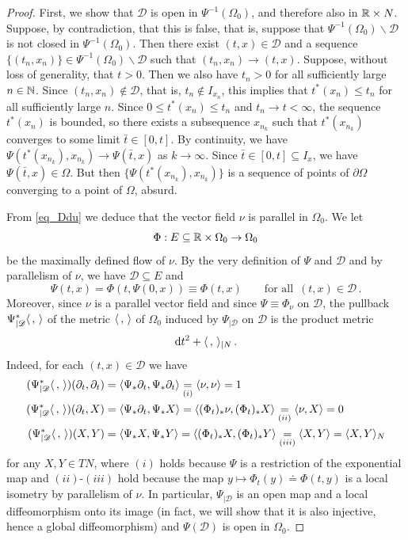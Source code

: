 \documentclass[10 pt,a4paper]{article}
\theoremstyle{definition}
\begin{document}
\begin{proof}
	First, we show that $\mathscr D$ is open in $\Psi^{-1}(\Omega_0)$, and therefore also in $\mathbb R\times N$. Suppose, by contradiction, that this is false, that is, suppose that $\Psi^{-1}(\Omega_0)\backslash\mathscr D$ is not closed in $\Psi^{-1}(\Omega_0)$. Then there exist $(t,x) \in \mathscr D$ and a sequence $\{(t_n,x_n)\} \in \Psi^{-1}(\Omega_0)\backslash\mathscr D$ such that $(t_n,x_n) \to (t,x)$. Suppose, without loss of generality, that $t>0$. Then we also have $t_n > 0$ for all sufficiently large $n\in\mathbb N$. Since $(t_n,x_n)\not\in\mathscr D$, that is, $t_n \not\in I_{x_n}$, this implies that $t^\ast(x_n) \leq t_n$ for all sufficiently large $n$. Since $0 \leq t^\ast(x_n) \leq t_n$ and $t_n \to t < \infty$, the sequence $t^\ast(x_n)$ is bounded, so there exists a subsequence $x_{n_k}$ such that $t^\ast(x_{n_k})$ converges to some limit $\bar t \in [0,t]$. By continuity, we have $\Psi(t^\ast(x_{n_k}),x_{n_k}) \to \Psi(\bar t,x)$ as $k\to\infty$. Since $\bar t \in [0,t] \subseteq I_x$, we have $\Psi(\bar t,x) \in \Omega$. But then $\{\Psi(t^\ast(x_{n_k}),x_{n_k})\}$ is a sequence of points of $\partial\Omega$ converging to a point of $\Omega$, absurd.
	
	From \eqref{eq_Ddu} we deduce that the vector field $\nu$ is parallel in $\Omega_0$. We let
	\[
		\Phi : E \subseteq \mathbb R \times \Omega_0 \to \Omega_0
	\]
	be the maximally defined flow of $\nu$. By the very definition of $\Psi$ and $\mathscr D$ and by parallelism of $\nu$, we have $\mathscr D \subseteq E$ and
	\[
		\Psi(t,x) = \Phi(t,\Psi(0,x)) \equiv \Phi(t,x) \qquad \text{for all } \, (t,x) \in \mathscr D \, .
	\]
	Moreover, since $\nu$ is a parallel vector field and since $\Psi \equiv \Phi_\nu$ on $\mathscr D$, the pullback $\Psi_{|\mathscr D}^\ast \langle \, , \, \rangle$ of the metric $\langle \, , \, \rangle$ of $\Omega_0$ induced by $\Psi_{|\mathscr D}$ on $\mathscr D$ is the product metric
	\[
		\mathrm{d} t^2 + \langle \, , \, \rangle_{|N} \, .
	\]
	Indeed, for each $(t,x)\in\mathscr D$ we have
	\begin{align*}
		(\Psi_{|\mathscr D}^\ast \langle \, , \, \rangle)(\partial_t,\partial_t) & = \langle\Psi_\ast\partial_t,\Psi_\ast\partial_t\rangle \underset{(i)}{=} \langle\nu,\nu\rangle = 1 \\
		(\Psi_{|\mathscr D}^\ast \langle \, , \, \rangle)(\partial_t,X) & = \langle\Psi_\ast\partial_t,\Psi_\ast X\rangle = \langle(\Phi_t)_\ast\nu,(\Phi_t)_\ast X\rangle \underset{(ii)}{=} \langle\nu,X\rangle = 0 \\
		(\Psi_{|\mathscr D}^\ast \langle \, , \, \rangle)(X,Y) & = \langle\Psi_\ast X,\Psi_\ast Y\rangle = \langle(\Phi_t)_\ast X,(\Phi_t)_\ast Y\rangle \underset{(iii)}{=} \langle X,Y\rangle = \langle X,Y\rangle_N
	\end{align*}
	for any $X,Y\in TN$, where $(i)$ holds because $\Psi$ is a restriction of the exponential map and $(ii)$-$(iii)$ hold because the map $y \mapsto \Phi_t(y) \doteq \Phi(t,y)$ is a local isometry by parallelism of $\nu$. In particular, $\Psi_{|\mathscr D}$ is an open map and a local diffeomorphism onto its image (in fact, we will show that it is also injective, hence a global diffeomorphism) and $\Psi(\mathscr D)$ is open in $\Omega_0$.
	

\end{proof}
\end{document}
